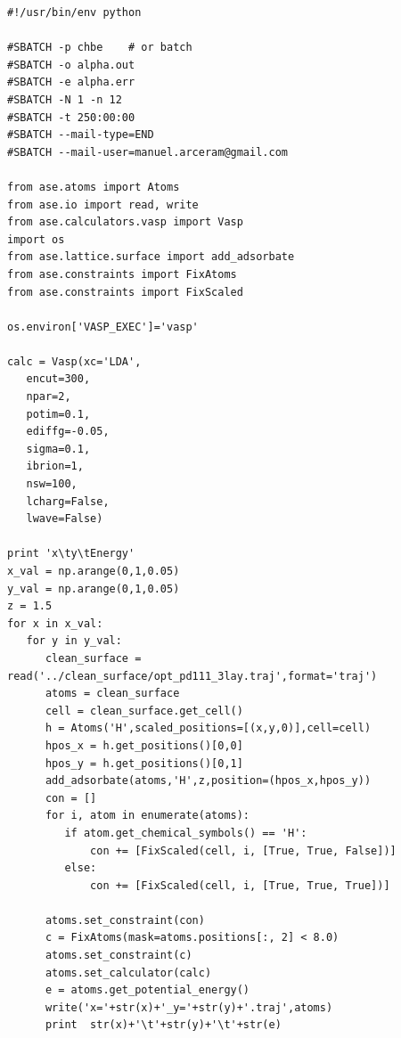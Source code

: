 \documentclass[11pt]{article}
\begin{document}
\begin{verbatim}
#!/usr/bin/env python

#SBATCH -p chbe    # or batch
#SBATCH -o alpha.out
#SBATCH -e alpha.err
#SBATCH -N 1 -n 12
#SBATCH -t 250:00:00
#SBATCH --mail-type=END
#SBATCH --mail-user=manuel.arceram@gmail.com

from ase.atoms import Atoms
from ase.io import read, write
from ase.calculators.vasp import Vasp
import os
from ase.lattice.surface import add_adsorbate
from ase.constraints import FixAtoms
from ase.constraints import FixScaled

os.environ['VASP_EXEC']='vasp'

calc = Vasp(xc='LDA',
   encut=300,
   npar=2,
   potim=0.1,
   ediffg=-0.05,
   sigma=0.1,
   ibrion=1,
   nsw=100,
   lcharg=False,
   lwave=False)

print 'x\ty\tEnergy'
x_val = np.arange(0,1,0.05)
y_val = np.arange(0,1,0.05)
z = 1.5
for x in x_val:
   for y in y_val:
      clean_surface = read('../clean_surface/opt_pd111_3lay.traj',format='traj')
      atoms = clean_surface
      cell = clean_surface.get_cell()   
      h = Atoms('H',scaled_positions=[(x,y,0)],cell=cell)
      hpos_x = h.get_positions()[0,0]
      hpos_y = h.get_positions()[0,1]
      add_adsorbate(atoms,'H',z,position=(hpos_x,hpos_y))
      con = []
      for i, atom in enumerate(atoms):
         if atom.get_chemical_symbols() == 'H':
             con += [FixScaled(cell, i, [True, True, False])]
         else:
             con += [FixScaled(cell, i, [True, True, True])]
      
      atoms.set_constraint(con)
      c = FixAtoms(mask=atoms.positions[:, 2] < 8.0)
      atoms.set_constraint(c)
      atoms.set_calculator(calc)
      e = atoms.get_potential_energy()
      write('x='+str(x)+'_y='+str(y)+'.traj',atoms)
      print  str(x)+'\t'+str(y)+'\t'+str(e)
\end{verbatim}
\end{document}

